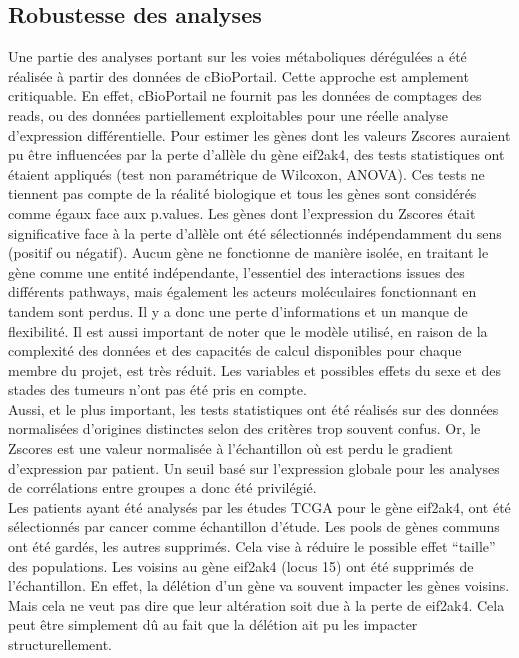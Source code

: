 \documentclass{style}
\begin{document}
\subsection{Robustesse des analyses}
Une partie des analyses portant sur les voies métaboliques dérégulées a été réalisée à partir des données de cBioPortail. Cette approche est amplement critiquable. En effet, cBioPortail ne fournit pas les données de comptages des reads, ou des données partiellement exploitables pour une réelle analyse d’expression différentielle. Pour estimer les gènes dont les valeurs Zscores auraient pu être influencées par la perte d’allèle du gène eif2ak4, des tests statistiques ont étaient appliqués (test non paramétrique de Wilcoxon, ANOVA). Ces tests ne tiennent pas compte de la réalité biologique et tous les gènes sont considérés comme égaux face aux p.values. Les gènes dont l’expression du Zscores était significative face à la perte d’allèle ont été sélectionnés indépendamment du sens (positif ou négatif). 
Aucun gène ne fonctionne de manière isolée, en traitant le gène comme une entité indépendante, l'essentiel des interactions issues des différents pathways, mais également les acteurs moléculaires fonctionnant en tandem sont perdus. Il y a donc une perte d'informations et un manque de flexibilité.
Il est aussi important de noter que le modèle utilisé, en raison de la complexité des données et des capacités de calcul disponibles pour chaque membre du projet, est très réduit. Les variables et possibles effets du sexe et des stades des tumeurs n’ont pas été pris en compte. \\ 
Aussi, et le plus important, les tests statistiques ont été réalisés sur des données normalisées d’origines distinctes selon des critères trop souvent confus.  Or, le Zscores est une valeur normalisée à l’échantillon où est perdu le gradient d’expression par patient. Un seuil basé sur l’expression globale pour les analyses de corrélations entre groupes a donc été privilégié. \\
Les patients ayant été analysés par les études TCGA pour le gène eif2ak4, ont été sélectionnés par cancer comme échantillon d’étude. Les pools de gènes communs ont été gardés, les autres supprimés. Cela vise à réduire le possible effet “taille” des populations. Les voisins au gène eif2ak4 (locus 15) ont été supprimés de l’échantillon. En effet, la délétion d’un gène va souvent impacter les gènes voisins. Mais cela ne veut pas dire que leur altération soit due à la perte de eif2ak4. Cela peut être simplement dû au fait que la délétion ait pu les impacter structurellement. \\
\end{document}
